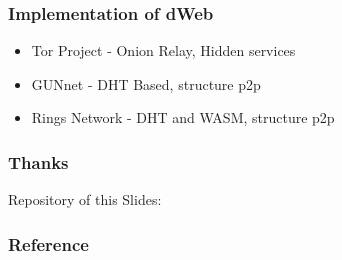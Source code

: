 \begin{frame}
\frametitle{ Implementation of dWeb }
  \begin{itemize}
  \item { Tor Project }
  - Onion Relay, Hidden services
  \item { GUNnet }
  - DHT Based, structure p2p
  \item { Rings Network }
  - DHT and WASM, structure p2p
  \end{itemize}
\end{frame}

\begin{frame}
  \frametitle{Thanks}
  Repository of this Slides:\newline \\
  \centering
\end{frame}

\begin{frame}
    \frametitle{Reference}
  
  
\end{frame}


